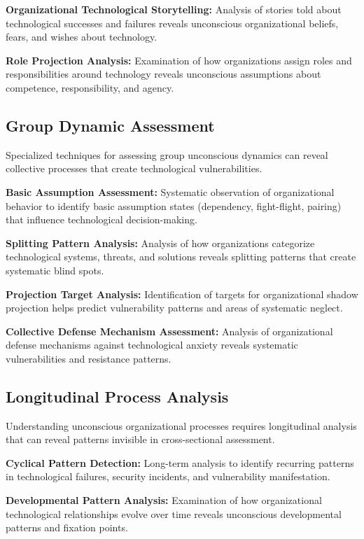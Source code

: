 \documentclass[10pt, twocolumn]{article}
\begin{document}
\textbf{Organizational Technological Storytelling:} Analysis of stories told about technological successes and failures reveals unconscious organizational beliefs, fears, and wishes about technology.

\textbf{Role Projection Analysis:} Examination of how organizations assign roles and responsibilities around technology reveals unconscious assumptions about competence, responsibility, and agency.

\subsection{Group Dynamic Assessment}

Specialized techniques for assessing group unconscious dynamics can reveal collective processes that create technological vulnerabilities.

\textbf{Basic Assumption Assessment:} Systematic observation of organizational behavior to identify basic assumption states (dependency, fight-flight, pairing) that influence technological decision-making.

\textbf{Splitting Pattern Analysis:} Analysis of how organizations categorize technological systems, threats, and solutions reveals splitting patterns that create systematic blind spots.

\textbf{Projection Target Analysis:} Identification of targets for organizational shadow projection helps predict vulnerability patterns and areas of systematic neglect.

\textbf{Collective Defense Mechanism Assessment:} Analysis of organizational defense mechanisms against technological anxiety reveals systematic vulnerabilities and resistance patterns.

\subsection{Longitudinal Process Analysis}

Understanding unconscious organizational processes requires longitudinal analysis that can reveal patterns invisible in cross-sectional assessment.

\textbf{Cyclical Pattern Detection:} Long-term analysis to identify recurring patterns in technological failures, security incidents, and vulnerability manifestation.

\textbf{Developmental Pattern Analysis:} Examination of how organizational technological relationships evolve over time reveals unconscious developmental patterns and fixation points.
\end{document}
